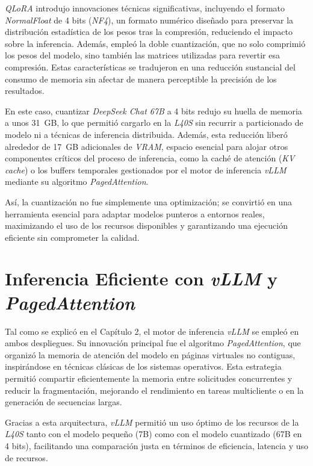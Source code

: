 \textit{QLoRA} introdujo innovaciones técnicas significativas, incluyendo el formato \textit{NormalFloat} de 4 bits (\textit{NF4}), un formato numérico diseñado para preservar la distribución estadística de los pesos tras la compresión, reduciendo el impacto sobre la inferencia. Además, empleó la doble cuantización, que no solo comprimió los pesos del modelo, sino también las matrices utilizadas para revertir esa compresión. Estas características se tradujeron en una reducción sustancial del consumo de memoria sin afectar de manera perceptible la precisión de los resultados.

En este caso, cuantizar \textit{DeepSeek Chat 67B} a 4 bits redujo su huella de memoria a unos 31~GB, lo que permitió cargarlo en la \textit{L40S} sin recurrir a particionado de modelo ni a técnicas de inferencia distribuida. Además, esta reducción liberó alrededor de 17~GB adicionales de \textit{VRAM}, espacio esencial para alojar otros componentes críticos del proceso de inferencia, como la caché de atención (\textit{KV cache}) o los buffers temporales gestionados por el motor de inferencia \textit{vLLM} mediante su algoritmo \textit{PagedAttention}.

Así, la cuantización no fue simplemente una optimización; se convirtió en una herramienta esencial para adaptar modelos punteros a entornos reales, maximizando el uso de los recursos disponibles y garantizando una ejecución eficiente sin comprometer la calidad.

\section{Inferencia Eficiente con \textit{vLLM} y \textit{PagedAttention}}
Tal como se explicó en el Capítulo 2, el motor de inferencia \textit{vLLM} se empleó en ambos despliegues. Su innovación principal fue el algoritmo \textit{PagedAttention}, que organizó la memoria de atención del modelo en páginas virtuales no contiguas, inspirándose en técnicas clásicas de los sistemas operativos. Esta estrategia permitió compartir eficientemente la memoria entre solicitudes concurrentes y reducir la fragmentación, mejorando el rendimiento en tareas multicliente o en la generación de secuencias largas.

Gracias a esta arquitectura, \textit{vLLM} permitió un uso óptimo de los recursos de la \textit{L40S} tanto con el modelo pequeño (7B) como con el modelo cuantizado (67B en 4 bits), facilitando una comparación justa en términos de eficiencia, latencia y uso de recursos.

